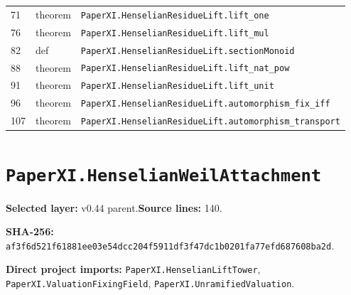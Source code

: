 \documentclass[10pt,oneside]{book}
\begin{document}
\begin{longtable}{@{}p{}p{}p{}@{}}
71&theorem&\nolinkurl{PaperXI.HenselianResidueLift.lift_one}\\

76&theorem&\nolinkurl{PaperXI.HenselianResidueLift.lift_mul}\\

82&def&\nolinkurl{PaperXI.HenselianResidueLift.sectionMonoid}\\

88&theorem&\nolinkurl{PaperXI.HenselianResidueLift.lift_nat_pow}\\

91&theorem&\nolinkurl{PaperXI.HenselianResidueLift.lift_unit}\\

96&theorem&\nolinkurl{PaperXI.HenselianResidueLift.automorphism_fix_iff}\\

107&theorem&\nolinkurl{PaperXI.HenselianResidueLift.automorphism_transport}\\

\bottomrule\end{longtable}

\section{\texorpdfstring{\nolinkurl{PaperXI.HenselianWeilAttachment}}{PaperXI.HenselianWeilAttachment}}\label{module:PaperXI.HenselianWeilAttachment}

\textbf{Selected layer:} v0.44 parent.\quad\textbf{Source lines:} 140.\par\textbf{SHA-256:} {\scriptsize\nolinkurl{af3f6d521f61881ee03e54dcc204f5911df3f47dc1b0201fa77efd687608ba2d}}.


\textbf{Direct project imports:} \nolinkurl{PaperXI.HenselianLiftTower}, \nolinkurl{PaperXI.ValuationFixingField}, \nolinkurl{PaperXI.UnramifiedValuation}.
\end{document}
